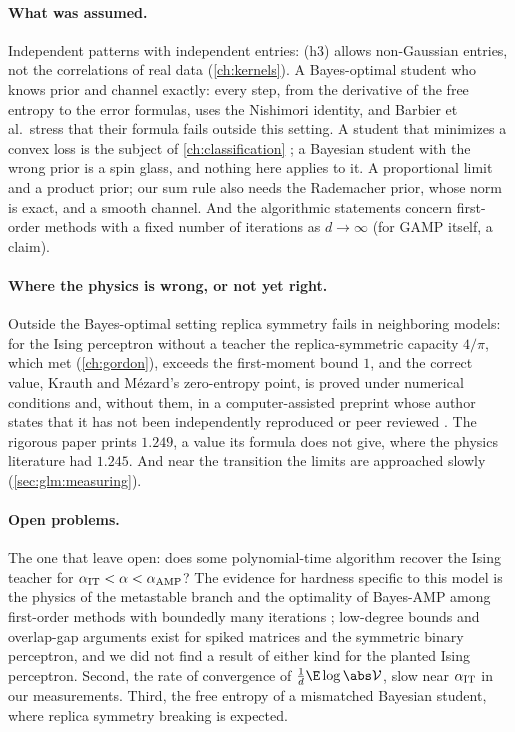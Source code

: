 \begin{refsection}
\paragraph{What was assumed.} Independent patterns with independent entries: (h3) allows non-Gaussian entries, not the correlations of real data (\cref{ch:kernels}). A Bayes-optimal student who knows prior and channel exactly: every step, from the derivative of the free entropy to the error formulas, uses the Nishimori identity, and Barbier et al.\ stress that their formula fails outside this setting. A student that minimizes a convex loss is the subject of \cref{ch:classification} \parencite{AubinEtAl2020}; a Bayesian student with the wrong prior is a spin glass, and nothing here applies to it. A proportional limit and a product prior; our sum rule also needs the Rademacher prior, whose norm is exact, and a smooth channel. And the algorithmic statements concern first-order methods with a fixed number of iterations as $d\to\infty$ (for GAMP itself, a claim).

\paragraph{Where the physics is wrong, or not yet right.} Outside the Bayes-optimal setting replica symmetry fails in neighboring models: for the Ising perceptron without a teacher the replica-symmetric capacity $4/\pi$, which \textcite{GardnerDerrida1988} met (\cref{ch:gordon}), exceeds the first-moment bound $1$, and the correct value, Krauth and M\'ezard's zero-entropy point, is proved under numerical conditions \parencite{DingSun2025,Huang2024} and, without them, in a computer-assisted preprint whose author states that it has not been independently reproduced or peer reviewed \parencite{Shmalo2026}. The rigorous paper prints $1.249$, a value its formula does not give, where the physics literature had $1.245$. And near the transition the limits are approached slowly (\cref{sec:glm:measuring}).

\paragraph{Open problems.} The one that \textcite{BarbierEtAl2019} leave open: does some polynomial-time algorithm recover the Ising teacher for $\alpha_{\mathrm{IT}}<\alpha<\alpha_{\mathrm{AMP}}$? The evidence for hardness specific to this model is the physics of the metastable branch and the optimality of Bayes-AMP among first-order methods with boundedly many iterations \parencite{CelentanoMontanariWu2020,MontanariWu2024}; low-degree bounds \parencite{KuniskyWeinBandeira2022} and overlap-gap arguments \parencite{GamarnikEtAl2022} exist for spiked matrices and the symmetric binary perceptron, and we did not find a result of either kind for the planted Ising perceptron. Second, the rate of convergence of $\frac1d\E\log\abs\glmV$, slow near $\alpha_{\mathrm{IT}}$ in our measurements. Third, the free entropy of a mismatched Bayesian student, where replica symmetry breaking is expected.


\end{refsection}
